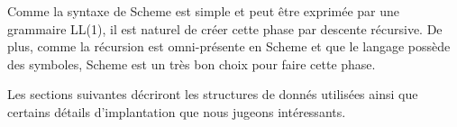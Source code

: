 \documentclass[11pt]{report}
\begin{document}
Comme la syntaxe de Scheme est simple et peut être exprimée par une
grammaire LL(1), il est naturel de créer cette phase par descente
récursive.  De plus, comme la récursion est omni-présente en Scheme et
que le langage possède des symboles, Scheme est un très bon choix pour
faire cette phase.

Les sections suivantes décriront les structures de donnés
utilisées ainsi que certains détails d'implantation que nous jugeons
intéressants.
\end{document}
